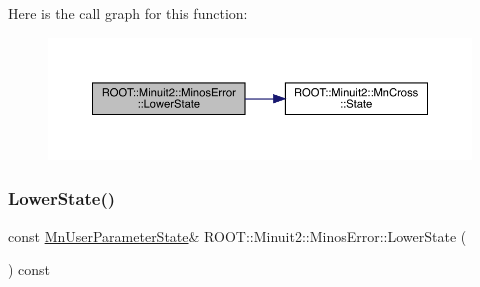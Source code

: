 Here is the call graph for this function\+:
\nopagebreak
\begin{figure}[H]
\begin{center}
\leavevmode
\includegraphics[width=350pt]{d2/dd1/classROOT_1_1Minuit2_1_1MinosError_ac10a407a1cb13f4e0c1b4d21383d15df_cgraph}
\end{center}
\end{figure}
\mbox{\label{classROOT_1_1Minuit2_1_1MinosError_ac10a407a1cb13f4e0c1b4d21383d15df}} 
\subsubsection{\texorpdfstring{LowerState()}{LowerState()}\hspace{0.1cm}{\footnotesize\ttfamily [2/2]}}
{\footnotesize\ttfamily const \mbox{\hyperlink{classROOT_1_1Minuit2_1_1MnUserParameterState}{Mn\+User\+Parameter\+State}}\& R\+O\+O\+T\+::\+Minuit2\+::\+Minos\+Error\+::\+Lower\+State (\begin{DoxyParamCaption}{ }\end{DoxyParamCaption}) const\hspace{0.3cm}{\ttfamily [inline]}}

